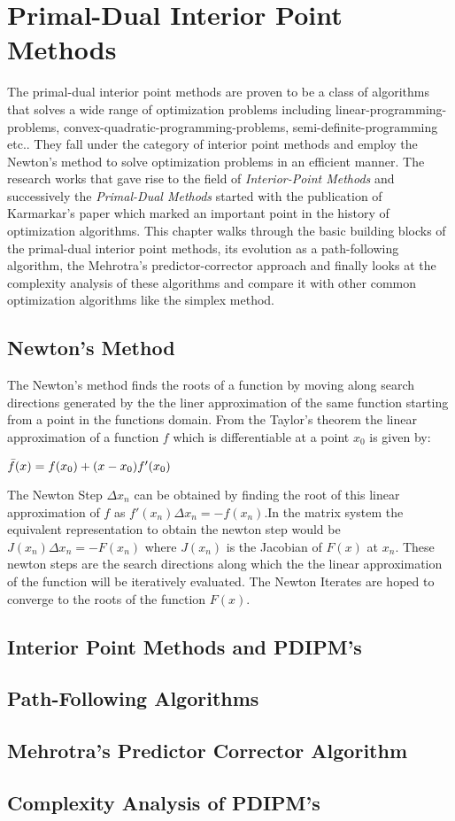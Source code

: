 \chapter{Primal-Dual Interior Point Methods}\label{chapter:PDIPM}
The primal-dual interior point methods are proven to be a class of algorithms that solves a wide range of optimization problems including linear-programming-problems, convex-quadratic-programming-problems, semi-definite-programming etc.\cite{wright1997primal}. They fall under the category of interior point methods and employ the Newton's method to solve optimization problems in an efficient manner. The research works that gave rise to the field of \textit{Interior-Point Methods} and successively the \textit{Primal-Dual Methods} started with the publication of Karmarkar's paper \cite{karmarkar1984new} which marked an important point in the history of optimization algorithms. This chapter walks through the basic building blocks of the primal-dual interior point methods, its evolution as a path-following algorithm, the Mehrotra's predictor-corrector approach and finally looks at the complexity analysis of these algorithms and compare it with other common optimization algorithms like the simplex method.
\section{Newton's Method}\label{NM}

The Newton's method finds the roots of a function by moving along search directions generated by the the liner approximation of the same function starting from a point in the functions domain. From the Taylor's theorem \cite{apostol1964mathematical} the linear approximation of a function \(f\) which is differentiable at a point \(x_0\) is given by:
\begin{center}
$\Bar{f}(x)=f(x_0)+(x-x_0)f'(x_0)$    
\end{center}
The Newton Step \( \Delta x_n\) can be obtained by finding the root of this linear approximation of \(f\) as $f'(x_n) \Delta x_n=-f(x_n)$.In the matrix system the equivalent representation to obtain the newton step would be {\(J(x_n) \Delta x_n=-F(x_n)\)} where \(J(x_n)\) is the Jacobian of \(F(x)\) at \(x_n\). These newton steps are the search directions along which the the linear approximation of the function will be iteratively evaluated. The Newton Iterates are hoped to converge to the roots of the function \(F(x)\)\cite{apostol1964mathematical}. 

\section{Interior Point Methods and PDIPM's}\label{IPM}

\section{Path-Following Algorithms}\label{PFA}

\section{Mehrotra's Predictor Corrector Algorithm}
\section{Complexity Analysis of PDIPM's}

